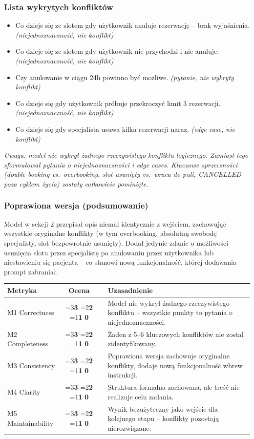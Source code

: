 \documentclass[12pt,a4paper]{article}
\newcommand{\scorebox}[1]{%
  \ifnum#1=3\colorbox{score3}{\textbf{3}}%
  \else\ifnum#1=2\colorbox{score2}{\textbf{2}}%
  \else\ifnum#1=1\colorbox{score1}{\textbf{1}}%
  \else\colorbox{score0}{\textbf{0}}\fi\fi\fi
}
\begin{document}
\subsubsection{Lista wykrytych konfliktów}
\begin{itemize}[leftmargin=1.5em, itemsep=2pt]
  \item Co dzieje się ze slotem gdy użytkownik anuluje rezerwację -- brak wyjaśnienia. \textit{(niejednoznaczność, nie konflikt)}
  \item Co dzieje się ze slotem gdy użytkownik nie przychodzi i nie anuluje. \textit{(niejednoznaczność, nie konflikt)}
  \item Czy anulowanie w ciągu 24h powinno być możliwe. \textit{(pytanie, nie wykryty konflikt)}
  \item Co dzieje się gdy użytkownik próbuje przekroczyć limit 3 rezerwacji. \textit{(niejednoznaczność, nie konflikt)}
  \item Co dzieje się gdy specjalista usuwa kilka rezerwacji naraz. \textit{(edge case, nie konflikt)}
\end{itemize}

\textit{Uwaga: model nie wykrył żadnego rzeczywistego konfliktu logicznego. Zamiast tego sformułował pytania o niejednoznaczności i edge cases. Kluczowe sprzeczności (double booking vs.\ overbooking, slot usunięty vs.\ wraca do puli, CANCELLED poza cyklem życia) zostały całkowicie pominięte.}

\subsubsection{Poprawiona wersja (podsumowanie)}
\small
Model w sekcji 2 przepisał opis niemal identycznie z wejściem, zachowując wszystkie oryginalne konflikty (w tym overbooking, absolutną swobodę specjalisty, slot bezpowrotnie usunięty). Dodał jedynie zdanie o możliwości usunięcia slotu przez specjalistę po anulowaniu przez użytkownika lub niestawieniu się pacjenta -- co stanowi nową funkcjonalność, której dodawania prompt zabraniał.
\normalsize

\vspace{0.5em}
\begin{tabular}{lccl}
\toprule
\textbf{Metryka} & \textbf{Ocena} & & \textbf{Uzasadnienie} \\
\midrule
M1 Correctness    & \scorebox{0} && Model nie wykrył żadnego rzeczywistego konfliktu -- wszystkie punkty to pytania o niejednoznaczności. \\
M2 Completeness   & \scorebox{0} && Żaden z 5--6 kluczowych konfliktów nie został zidentyfikowany. \\
M3 Consistency    & \scorebox{1} && Poprawiona wersja zachowuje oryginalne konflikty, dodaje nową funkcjonalność wbrew instrukcji. \\
M4 Clarity        & \scorebox{1} && Struktura formalna zachowana, ale treść nie realizuje celu zadania. \\
M5 Maintainability & \scorebox{0} && Wynik bezużyteczny jako wejście dla kolejnego etapu -- konflikty pozostają nierozwiązane. \\
\bottomrule
\end{tabular}
\end{document}
